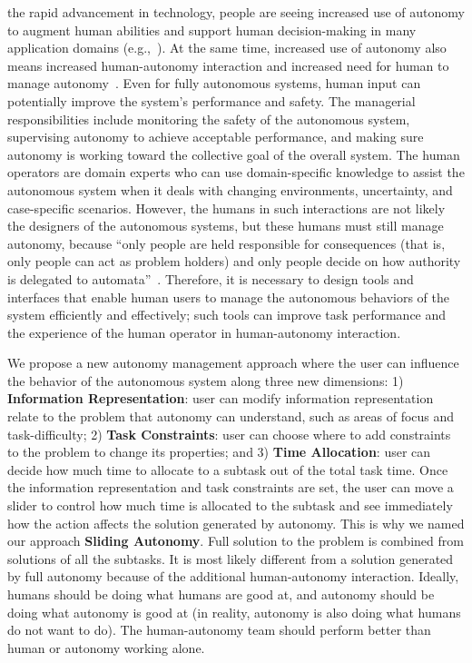 \documentclass[journal]{IEEEtran}
\begin{document}
 the rapid advancement in technology, people are seeing increased use of autonomy to augment human abilities and support human decision-making in many application domains (e.g.,~\cite{Chun2010Limousine,Casper2003Human,Lin2010Supporting,Robins2009From}). At the same time, increased use of autonomy also means increased human-autonomy interaction and increased need for human to manage autonomy~\cite{Bainbridge1983Ironies}. Even for fully autonomous systems, human input can potentially improve the system's performance and safety. The managerial responsibilities include monitoring the safety of the autonomous system, supervising autonomy to achieve acceptable performance, and making sure autonomy is working toward the collective goal of the overall system. The human operators are domain experts who can use domain-specific knowledge to assist the autonomous system when it deals with changing environments, uncertainty, and case-specific scenarios. However, the humans in such interactions are not likely the designers of the autonomous systems, but these humans must still manage autonomy, because ``only people are held responsible for consequences (that is, only people can act as problem holders) and only people decide on how authority is delegated to automata''~\cite{Woods2006Joint,Bradshaw2013Seven}. Therefore, it is necessary to design tools and interfaces that enable human users to manage the autonomous behaviors of the system efficiently and effectively; such tools can improve task performance and the experience of the human operator in human-autonomy interaction.

We propose a new autonomy management approach where the user can influence the behavior of the autonomous system along three new dimensions: 1) \textbf{Information Representation}: user can modify information representation relate to the problem that autonomy can understand, such as areas of focus and task-difficulty; 2) \textbf{Task Constraints}: user can choose where to add constraints to the problem to change its properties; and 3) \textbf{Time Allocation}: user can decide how much time to allocate to a subtask out of the total task time. Once the information representation and task constraints are set, the user can move a slider to control how much time is allocated to the subtask and see immediately how the action affects the solution generated by autonomy. This is why we named our approach \textbf{Sliding Autonomy}. Full solution to the problem is combined from solutions of all the subtasks. It is most likely different from a solution generated by full autonomy because of the additional human-autonomy interaction. Ideally, humans should be doing what humans are good at, and autonomy should be doing what autonomy is good at (in reality, autonomy is also doing what humans do not want to do). The human-autonomy team should perform better than human or autonomy working alone.
\end{document}
